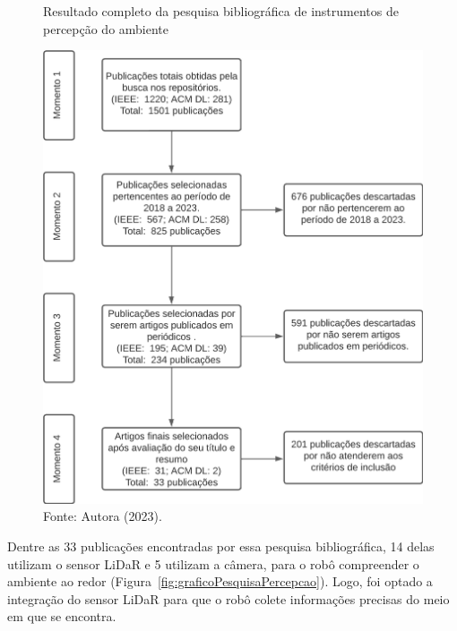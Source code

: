 \begin{figure}[h]
    \centering
    \caption{Resultado completo da pesquisa bibliográfica de instrumentos de percepção do ambiente}
    \includegraphics[scale=0.8]{diagramaResultadosPercepcao.png}
    \caption*{Fonte: Autora (2023).}
    \label{fig:diagramaResultadosPercepcao}
\end{figure}

Dentre as 33 publicações encontradas por essa pesquisa bibliográfica, 14 delas utilizam o sensor LiDaR e 5 utilizam a câmera, para o robô compreender o ambiente ao redor (Figura~\ref{fig:graficoPesquisaPercepcao}). Logo, foi optado a integração do sensor LiDaR para que o robô colete informações precisas do meio em que se encontra.

